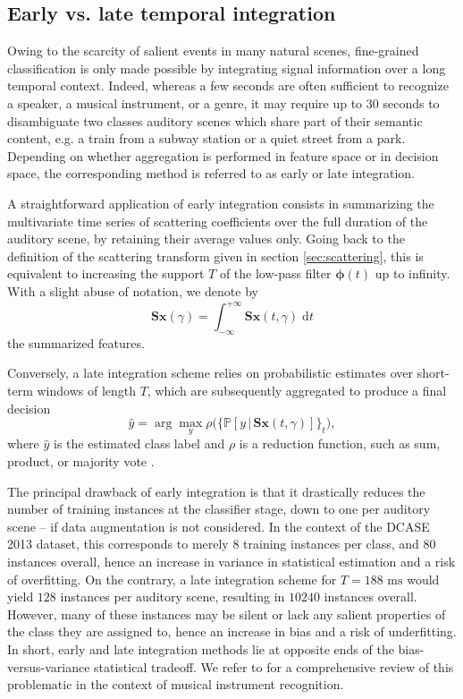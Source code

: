 \documentclass[journal]{IEEEtran}
\makeatletter
\newcommand*{\eg}{e.g.\@\xspace}
\newcommand*{\vs}{vs.\@\xspace}
\makeatother
\begin{document}
\subsection{Early \vs late temporal integration}
Owing to the scarcity of salient events in many natural scenes,
fine-grained classification is only made
possible by integrating signal information over a long temporal context.
Indeed, whereas a few seconds are often sufficient to recognize a speaker,
a musical instrument, or a genre, it may require up to 30 seconds
to disambiguate two classes auditory scenes which share part of their semantic content, \eg a train from a subway station or a quiet street from a park.
Depending on whether aggregation is performed in feature space or in decision space, the corresponding method is referred to as early or late integration.

A straightforward application of early integration consists in summarizing the multivariate time series of scattering coefficients over the full duration of the auditory scene, by retaining their average values only.
Going back to the definition of the scattering transform given in section \ref{sec:scattering}, this is equivalent to increasing the support $T$ of the low-pass filter $\boldsymbol{\phi}(t)$ up to infinity. With a slight abuse of notation, we denote by
\begin{equation}
\mathbf{S}\boldsymbol{x}(\gamma) =
\int_{-\infty}^{+\infty} \mathbf{S}\boldsymbol{x}(t,\gamma)\;\mathrm{d}t
\end{equation}
the summarized features.

Conversely, a late integration scheme relies on probabilistic estimates over short-term windows of length $T$, which are subsequently aggregated to produce a final decision
\begin{equation}
\hat{y} = \arg \max_{y} \rho\Big(\big\{ \mathbb{P}\left[y \,\vert\, \mathbf{S}\boldsymbol{x}(t,\gamma) \right] \big\}_{t} \Big),
\end{equation}
where $\hat{y}$ is the estimated class label and $\rho$ is a reduction function, such as sum, product, or majority vote \cite{Kittler1998}.

The principal drawback of early integration is that it drastically reduces the number of training instances at the classifier stage, down to one per auditory scene -- if data augmentation is not considered.
In the context of the DCASE 2013 dataset, this corresponds to merely $8$ training instances per class, and $80$ instances overall, hence an increase in variance in statistical estimation and a risk of overfitting.
On the contrary, a late integration scheme for $T=188\textrm{ ms}$ would yield $128$ instances per auditory scene, resulting in $10240$ instances overall.
However, many of these instances may be silent or lack any salient properties of the class they are assigned to, hence an increase in bias and a risk of underfitting.
In short, early and late integration methods lie at opposite ends of the bias-versus-variance statistical tradeoff. We refer to \cite{Joder2009} for a comprehensive review of this problematic in the context of musical instrument recognition.
\end{document}
